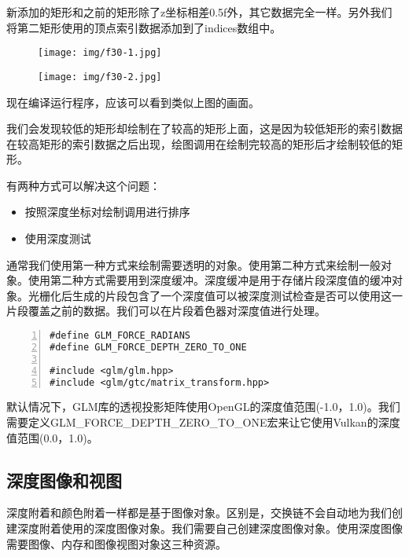 \documentclass{ctexart}
\begin{document}
新添加的矩形和之前的矩形除了z坐标相差0.5f外，其它数据完全一样。另外我们将第二矩形使用的顶点索引数据添加到了indices数组中。

\begin{figure}[H]
	\centering
	\texttt{[image: img/f30-1.jpg]}
\end{figure}

\begin{figure}[H]
	\centering
	\texttt{[image: img/f30-2.jpg]}
\end{figure}

现在编译运行程序，应该可以看到类似上图的画面。

我们会发现较低的矩形却绘制在了较高的矩形上面，这是因为较低矩形的索引数据在较高矩形的索引数据之后出现，绘图调用在绘制完较高的矩形后才绘制较低的矩形。

有两种方式可以解决这个问题：

\begin{itemize}
	\item 按照深度坐标对绘制调用进行排序
	\item 使用深度测试
\end{itemize}

通常我们使用第一种方式来绘制需要透明的对象。使用第二种方式来绘制一般对象。使用第二种方式需要用到深度缓冲。深度缓冲是用于存储片段深度值的缓冲对象。光栅化后生成的片段包含了一个深度值可以被深度测试检查是否可以使用这一片段覆盖之前的数据。我们可以在片段着色器对深度值进行处理。

\begin{lstlisting}[language={[ANSI]C},keywordstyle=\color{blue!70},commentstyle=\color{red!50!green!50!blue!50},frame=shadowbox, rulesepcolor=\color{red!20!green!20!blue!20},basicstyle=\small,numbers=left, numberstyle=\tiny,breaklines=true]
#define GLM_FORCE_RADIANS
#define GLM_FORCE_DEPTH_ZERO_TO_ONE

#include <glm/glm.hpp>
#include <glm/gtc/matrix_transform.hpp>
\end{lstlisting}

默认情况下，GLM库的透视投影矩阵使用OpenGL的深度值范围(-1.0，1.0)。我们需要定义GLM\_FORCE\_DEPTH\_ZERO\_TO\_ONE宏来让它使用Vulkan的深度值范围(0.0，1.0)。

\subsection{深度图像和视图}

深度附着和颜色附着一样都是基于图像对象。区别是，交换链不会自动地为我们创建深度附着使用的深度图像对象。我们需要自己创建深度图像对象。使用深度图像需要图像、内存和图像视图对象这三种资源。
\end{document}
